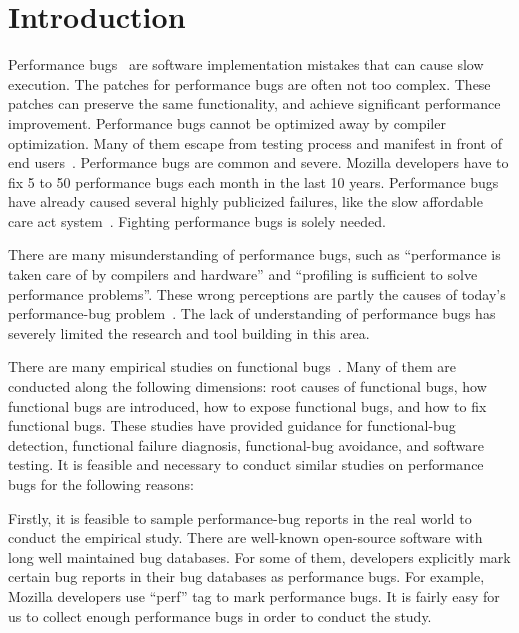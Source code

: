 \section{Introduction}
\label{sec:3_introduction}

Performance bugs~\citep{s2e,perf.fse10,rily.perftest,perfantipattern} 
are software implementation mistakes that can cause slow execution.
The patches for performance bugs are often not too complex.
These patches can preserve the same functionality, and achieve significant performance improvement. 
Performance bugs cannot be optimized away by compiler optimization. 
Many of them escape from testing process and manifest in front of end users~\citep{xiao13:context}.
Performance bugs are common and severe. 
Mozilla developers have to fix 5 to 50 performance bugs each month in the last 10 years. 
Performance bugs have already caused several highly publicized failures, 
like the slow affordable care act system~\citep{ACA-health}.
Fighting performance bugs is solely needed.  

There are many misunderstanding of performance bugs, 
such as ``performance is taken care of by compilers and hardware'' and 
``profiling is sufficient to solve performance problems''. 
These wrong perceptions are partly the causes of today's performance-bug problem~\citep{lies}. 
The lack of understanding of performance bugs has severely limited the research and tool building in this area. 

There are many empirical studies on functional bugs~\citep{chou01empirical,characteristics.asplos08, 10yearlinux,emmett.ppopp10,
sullivan92comparison,Lu.study.fast}. 
Many of them are conducted along the following dimensions: 
root causes of functional bugs, 
how functional bugs are introduced, how to expose functional bugs, 
and how to fix functional bugs. 
These studies have provided guidance for functional-bug detection, 
functional failure diagnosis, functional-bug avoidance, and software testing. 
It is feasible and necessary to conduct similar studies on performance bugs for the following reasons: 

Firstly, it is feasible to sample performance-bug reports in the real world to conduct the empirical study. 
There are well-known open-source software with long well maintained bug databases. 
For some of them, developers explicitly mark certain bug reports in their bug databases as performance bugs. 
For example, Mozilla developers use ``perf'' tag to mark performance bugs. 
It is fairly easy for us to collect enough performance bugs in order to conduct the study.

